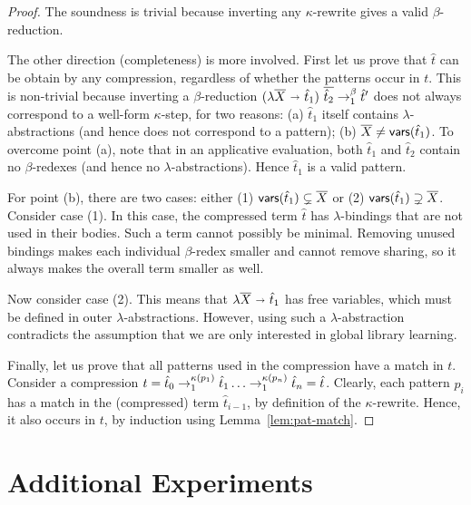 \begin{proof}
The soundness is trivial because inverting any $\kappa$-rewrite gives a valid $\beta$-reduction.

The other direction (completeness) is more involved.
%
First let us prove that $\hat{t}$ can be obtain by any compression, regardless of whether the patterns occur in $t$.
%
This is non-trivial
because inverting a $\beta$-reduction $(\lambda \many{X} \bnd \hat{t}_1)\ \many{\hat{t}_2}  \betared  \hat{t}'$
does not always correspond to a well-form $\kappa$-step,
for two reasons:
(a) $\hat{t}_1$ itself contains $\lambda$-abstractions (and hence does not correspond to a pattern);
(b) $\overline{X} \neq \mathsf{vars}(\hat{t}_1)$.
%
To overcome point (a), note that in an applicative evaluation,
both $\hat{t}_1$ and $\hat{t}_2$ contain no $\beta$-redexes (and hence no $\lambda$-abstractions).
%
Hence  $\hat{t}_1$ is a valid pattern.

For point (b), there are two cases: either (1) $\mathsf{vars}(\hat{t}_1) \subsetneq \overline{X}$
or (2) $\mathsf{vars}(\hat{t}_1) \supsetneq \overline{X}$.
%
Consider case (1).
%
In this case, the compressed term $\hat{t}$ has $\lambda$-bindings that are not used in their bodies.
%
Such a term cannot possibly be minimal.
%
Removing unused bindings makes each individual $\beta$-redex smaller and cannot remove sharing,
so it always makes the overall term smaller as well.

Now consider case (2).
%
This means that $\lambda \overline{X} \ \mathbf{\shortrightarrow}\  \hat{t}_1$ has free variables, 
which must be defined in outer $\lambda$-abstractions.
%
However, using such a $\lambda$-abstraction contradicts the assumption that we are only interested in global library learning.

Finally, let us prove that all patterns used in the compression have a match in $t$.
%
Consider a compression $t = \hat{t}_0 \rwsteps{\kappa(p_1)} \hat{t}_1 \dots \rwsteps{\kappa(p_n)}  \hat{t}_n = \hat{t}$.
%
Clearly, each pattern $p_i$ has a match in the (compressed) term $\hat{t}_{i-1}$, by definition of the $\kappa$-rewrite.
%
Hence, it also occurs in $t$, by induction using Lemma~\ref{lem:pat-match}.
\end{proof}



\newpage
\section{Additional Experiments}\label{app:eval}

